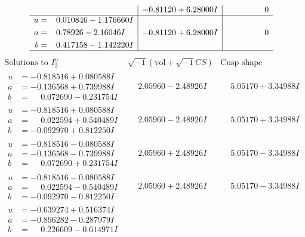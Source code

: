 \documentclass[1p]{elsarticle_modified}
\theoremstyle{definition}
\newcommand{\I}{\sqrt{-1}}
\begin{document}
$$\begin{array}{c|c|c}
 & -0.81120 + 6.28000 I & \phantom{-0.000000 } 0 \\ \hline\begin{aligned}
u &= \phantom{-}0.010846 - 1.176660 I \\
a &= \phantom{-}0.78926 - 2.16046 I \\
b &= \phantom{-}0.417158 - 1.142220 I\end{aligned}
 & -0.81120 + 6.28000 I & \phantom{-0.000000 } 0\\
 \hline 
 \end{array}$$\newpage$$\begin{array}{c|c|c}  
\text{Solutions to }I^u_{2}& \I (\text{vol} + \sqrt{-1}CS) & \text{Cusp shape}\\
 \hline 
\begin{aligned}
u &= -0.818516 + 0.080588 I \\
a &= -0.136568 + 0.739988 I \\
b &= \phantom{-}0.072690 - 0.231754 I\end{aligned}
 & \phantom{-}2.05960 - 2.48926 I & \phantom{-}5.05170 + 3.34988 I \\ \hline\begin{aligned}
u &= -0.818516 + 0.080588 I \\
a &= \phantom{-}0.022594 + 0.540489 I \\
b &= -0.092970 + 0.812250 I\end{aligned}
 & \phantom{-}2.05960 - 2.48926 I & \phantom{-}5.05170 + 3.34988 I \\ \hline\begin{aligned}
u &= -0.818516 - 0.080588 I \\
a &= -0.136568 - 0.739988 I \\
b &= \phantom{-}0.072690 + 0.231754 I\end{aligned}
 & \phantom{-}2.05960 + 2.48926 I & \phantom{-}5.05170 - 3.34988 I \\ \hline\begin{aligned}
u &= -0.818516 - 0.080588 I \\
a &= \phantom{-}0.022594 - 0.540489 I \\
b &= -0.092970 - 0.812250 I\end{aligned}
 & \phantom{-}2.05960 + 2.48926 I & \phantom{-}5.05170 - 3.34988 I \\ \hline\begin{aligned}
u &= -0.639274 + 0.516374 I \\
a &= -0.896282 - 0.287979 I \\
b &= \phantom{-}0.226609 - 0.614971 I\end{aligned}

\end{array}$$
\end{document}
